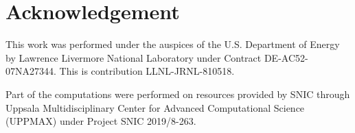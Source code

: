 \section*{Acknowledgement}

This work was performed under the auspices of the U.S. Department of Energy by Lawrence Livermore National Laboratory under Contract DE-AC52-07NA27344. This is contribution LLNL-JRNL-810518.

Part of the computations were performed on resources provided by SNIC through Uppsala Multidisciplinary Center for Advanced Computational Science (UPPMAX) under Project SNIC 2019/8-263.
